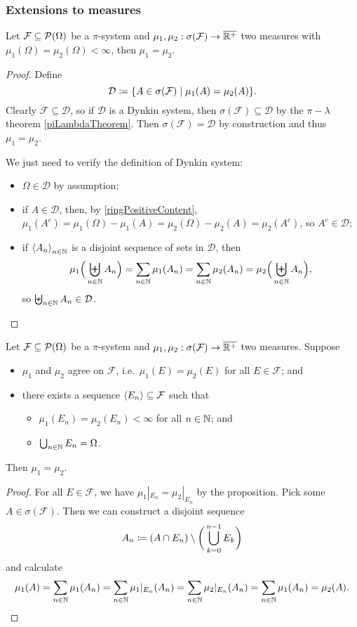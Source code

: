 \subsubsection{Extensions to measures}
\begin{proposition}
Let $\mathcal{F}\subseteq \operatorname{\mathcal{P}}(\Omega)$ be a $\pi$-system and $\mu_1, \mu_2: \sigma(\mathcal{F}) \to \overline{\mathbb{R}^+}$ two measures with $\mu_1(\Omega) = \mu_2(\Omega) < \infty$, then $\mu_1 = \mu_2$.
\end{proposition}
\begin{proof}
Define
\[ \mathcal{D} \defeq \setbuilder{A\in \sigma(\mathcal{F})}{\mu_1(A) = \mu_2(A)}. \]
Clearly $\mathcal{F} \subseteq \mathcal{D}$, so if $\mathcal{D}$ is a Dynkin system, then $\sigma(\mathcal{F}) \subseteq \mathcal{D}$ by the $\pi-\lambda$ theorem \ref{piLambdaTheorem}. Then $\sigma(\mathcal{F}) = \mathcal{D}$ by construction and thus $\mu_1 = \mu_2$.

We just need to verify the definition of Dynkin system:
\begin{itemize}
\item $\Omega\in\mathcal{D}$ by assumption;
\item if $A\in\mathcal{D}$, then, by \ref{ringPositiveContent}, $\mu_1(A^c) = \mu_1(\Omega) - \mu_1(A) = \mu_2(\Omega) - \mu_2(A) = \mu_2(A^c)$, so $A^c\in \mathcal{D}$;
\item if $\left\langle A_n \right\rangle_{n\in\mathbb{N}}$ is a disjoint sequence of sets in $\mathcal{D}$, then
\[ \mu_1\Big(\biguplus_{n\in\mathbb{N}}A_n\Big) = \sum_{n\in\mathbb{N}}\mu_1(A_n) = \sum_{n\in\mathbb{N}}\mu_2(A_n) = \mu_2\Big(\biguplus_{n\in\mathbb{N}}A_n\Big), \]
so $\biguplus_{n\in\mathbb{N}}A_n\in\mathcal{D}$.
\end{itemize}
\end{proof}
\begin{corollary} \label{sigmaFiniteUniqueExtension}
Let $\mathcal{F}\subseteq \operatorname{\mathcal{P}}(\Omega)$ be a $\pi$-system and $\mu_1, \mu_2: \sigma(\mathcal{F}) \to \overline{\mathbb{R}^+}$ two measures. Suppose
\begin{itemize}
\item $\mu_1$ and $\mu_2$ agree on $\mathcal{F}$, i.e.\ $\mu_1(E) = \mu_2(E)$ for all $E\in\mathcal{F}$; and
\item there exists a sequence $\left\langle E_n \right\rangle\subseteq \mathcal{F}$ such that
\begin{itemize}
\item $\mu_1(E_n) = \mu_2(E_n) < \infty$ for all $n\in\mathbb{N}$; and
\item $\bigcup_{n\in\mathbb{N}} E_n = \Omega$.
\end{itemize}
\end{itemize}
Then $\mu_1 = \mu_2$.
\end{corollary}
\begin{proof}
For all $E\in \mathcal{F}$, we have $\mu_1|_{E_n} = \mu_2|_{E_n}$ by the proposition. Pick some $A\in \sigma(\mathcal{F})$. Then we can construct a disjoint sequence
\[ A_n \coloneqq (A\cap E_n)\setminus \bigg(\bigcup_{k=0}^{n-1}E_k\bigg) \]
and calculate
\[ \mu_1(A) = \sum_{n\in \mathbb{N}}\mu_1(A_n) = \sum_{n\in \mathbb{N}}\mu_1|_{E_n}(A_n) = \sum_{n\in \mathbb{N}}\mu_2|_{E_n}(A_n) = \sum_{n\in \mathbb{N}}\mu_1(A_n) = \mu_2(A). \]
\end{proof}

